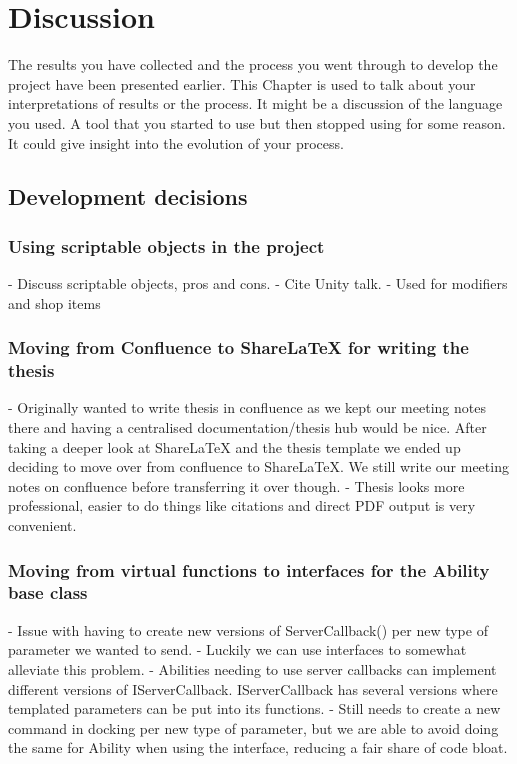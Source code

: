 \chapter{Discussion}
\label{chap:discussion}

The results you have collected and the process you went through to develop the project have been presented earlier.  This Chapter is used to talk about your interpretations of results or the process.  It might be a discussion of the language you used.  A tool that you started to use but then stopped using for some reason.  It could give insight into the evolution of your process.

\section{Development decisions}
\subsection{Using scriptable objects in the project}
    - Discuss scriptable objects, pros and cons. 
    - Cite Unity talk.
    - Used for modifiers and shop items
    
\subsection{Moving from Confluence to ShareLaTeX for writing the thesis}
    - Originally wanted to write thesis in confluence as we kept our meeting notes there and having a centralised documentation/thesis hub would be nice. After taking a deeper look at ShareLaTeX and the thesis template we ended up deciding to move over from confluence to ShareLaTeX. We still write our meeting notes on confluence before transferring it over though.
    - Thesis looks more professional, easier to do things like citations and direct PDF output is very convenient. 

\subsection{Moving from virtual functions to interfaces for the Ability base class}
    - Issue with having to create new versions of ServerCallback() per new type of parameter we wanted to send. 
    - Luckily we can use interfaces to somewhat alleviate this problem. 
    - Abilities needing to use server callbacks can implement different versions of IServerCallback. IServerCallback has several versions where templated parameters can be put into its functions.  
    - Still needs to create a new command in docking per new type of parameter, but we are able to avoid doing the same for Ability when using the interface, reducing a fair share of code bloat. 

